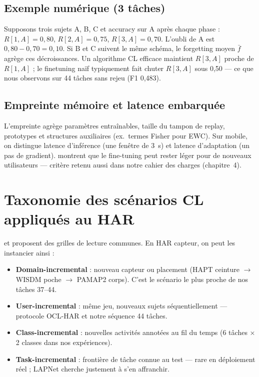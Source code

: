 \documentclass[a4paper,12pt]{report}
\begin{document}
\subsection{Exemple numérique (3 tâches)}

Supposons trois sujets A, B, C et accuracy sur A après chaque phase :
$R[1,A]=0{,}80$, $R[2,A]=0{,}75$, $R[3,A]=0{,}70$. L'oubli de A est
$0{,}80 - 0{,}70 = 0{,}10$. Si B et C suivent le même schéma, le forgetting
moyen $\bar{f}$ agrège ces décroissances. Un algorithme CL efficace maintient
$R[3,A]$ proche de $R[1,A]$ ; le finetuning naïf typiquement fait chuter
$R[3,A]$ sous 0,50 — ce que nous observons sur 44 tâches sans rejeu (F1 0,483).

\subsection{Empreinte mémoire et latence embarquée}

L'empreinte agrège paramètres entraînables, taille du tampon de replay,
prototypes \parencite{adaimi2022} et structures auxiliaires (ex.\ termes Fisher
pour EWC). Sur mobile, on distingue latence d'inférence (une fenêtre de 3~s)
et latence d'adaptation (un pas de gradient). \textcite{amrani2025} montrent
que le fine-tuning peut rester léger pour de nouveaux utilisateurs — critère
retenu aussi dans notre cahier des charges (chapitre~4).

\section{Taxonomie des scénarios CL appliqués au HAR}

\textcite{delange2021} et \textcite{vdven2022} proposent des grilles de lecture
communes. En HAR capteur, on peut les instancier ainsi :

\begin{itemize}
  \item \textbf{Domain-incremental} : nouveau capteur ou placement (HAPT ceinture
  $\rightarrow$ WISDM poche $\rightarrow$ PAMAP2 corps). C'est le scénario le plus
  proche de nos tâches 37--44.
  \item \textbf{User-incremental} : même jeu, nouveaux sujets séquentiellement —
  protocole OCL-HAR \parencite{schiemer2023} et notre séquence 44 tâches.
  \item \textbf{Class-incremental} : nouvelles activités annotées au fil du temps
  (6 tâches $\times$ 2 classes dans nos expériences).
  \item \textbf{Task-incremental} : frontière de tâche connue au test — rare en
  déploiement réel ; LAPNet \parencite{adaimi2022} cherche justement à s'en affranchir.
\end{itemize}
\end{document}
